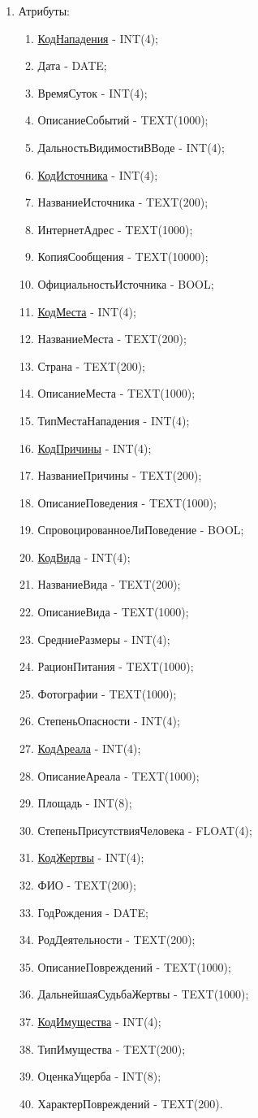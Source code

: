\documentclass[russian,utf8,simple,emptystyle]{eskdtext}
\begin{document}
\begin{enumerate}
	\item Атрибуты:
	\begin{enumerate}
		\item \underline{КодНападения} - INT(4);
		\item Дата - DATE;
		\item ВремяСуток - INT(4);
		\item ОписаниеСобытий - TEXT(1000);
		\item ДальностьВидимостиВВоде - INT(4);
		\item \underline{КодИсточника} - INT(4);
		\item НазваниеИсточника - TEXT(200);
		\item ИнтернетАдрес - TEXT(1000);
		\item КопияСообщения - TEXT(10000);
		\item ОфициальностьИсточника - BOOL;
		\item \underline{КодМеста} - INT(4);
		\item НазваниеМеста - TEXT(200);
		\item Страна - TEXT(200);
		\item ОписаниеМеста - TEXT(1000);
		\item ТипМестаНападения - INT(4);
		\item \underline{КодПричины} - INT(4);
		\item НазваниеПричины - TEXT(200);
		\item ОписаниеПоведения - TEXT(1000);
		\item СпровоцированноеЛиПоведение - BOOL;
		\item \underline{КодВида} - INT(4);
		\item НазваниеВида - TEXT(200);
		\item ОписаниеВида - TEXT(1000);
		\item СредниеРазмеры - INT(4);
		\item РационПитания - TEXT(1000);
		\item Фотографии - TEXT(1000);
		\item СтепеньОпасности - INT(4);
		\item \underline{КодАреала} - INT(4);
		\item ОписаниеАреала - TEXT(1000);
		\item Площадь - INT(8);
		\item СтепеньПрисутствияЧеловека - FLOAT(4);
		\item \underline{КодЖертвы} - INT(4);
		\item ФИО - TEXT(200);
		\item ГодРождения - DATE;
		\item РодДеятельности - TEXT(200);
		\item ОписаниеПовреждений - TEXT(1000);
		\item ДальнейшаяСудьбаЖертвы - TEXT(1000);
		\item \underline{КодИмущества} - INT(4);
		\item ТипИмущества - TEXT(200);
		\item ОценкаУщерба - INT(8);
		\item ХарактерПовреждений - TEXT(200).
	\end{enumerate}
	

\end{enumerate}
\end{document}
